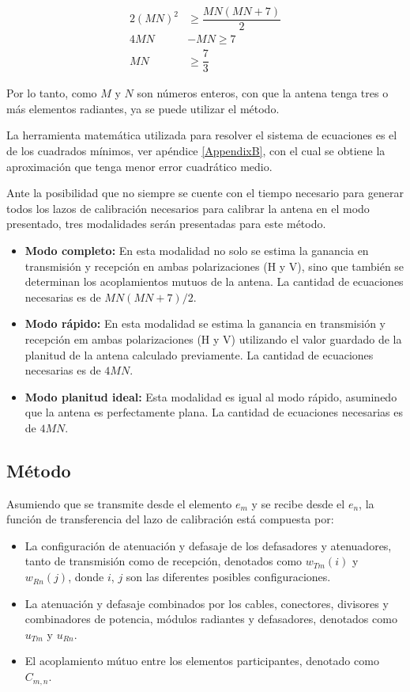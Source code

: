$$
\begin{aligned}
	2(MN)^2 &\ge  \dfrac{MN(MN + 7)}{2} \\
	4MN &- MN \ge7 \\
	MN &\ge \dfrac{7}{3}
\end{aligned}
$$

Por lo tanto, como $M$ y $N$ son números enteros, con que la antena tenga tres o más elementos radiantes, ya se puede utilizar el método.

La herramienta matemática utilizada para resolver el sistema de ecuaciones es el de los cuadrados mínimos,
ver apéndice \ref{AppendixB}, con el cual se obtiene la aproximación que tenga menor error cuadrático medio.

Ante la posibilidad que no siempre se cuente con el tiempo necesario para generar todos los lazos de calibración necesarios
para calibrar la antena en el modo presentado, tres modalidades serán presentadas para este método.

\begin{itemize}
	\item \textbf{Modo completo:} En esta modalidad no solo se estima la ganancia en transmisión y recepción en ambas
		polarizaciones (H y V), sino que también se determinan los acoplamientos mutuos de la antena. La cantidad de ecuaciones necesarias es
		de $MN(MN + 7)/2$.
	\item \textbf{Modo rápido:} En esta modalidad se estima la ganancia en transmisión y recepción em ambas polarizaciones
		(H y V) utilizando el valor guardado de la planitud de la antena calculado previamente. La cantidad de ecuaciones necesarias
		es de $4MN$.
	\item \textbf{Modo planitud ideal:} Esta modalidad es igual al modo rápido, asuminedo que la antena es perfectamente plana.
		La cantidad de ecuaciones necesarias es de $4MN$.
\end{itemize}


\subsection{Método}

Asumiendo que se transmite desde el elemento $e_m$ y se recibe desde el $e_n$, la función de transferencia del lazo de
calibración está compuesta por:

\begin{itemize}
	\item La configuración de atenuación y defasaje de los defasadores y atenuadores, tanto de transmisión como de recepción,
		denotados como $w_{Tm}(i)$ y $w_{Rn}(j)$, donde $i$, $j$ son las diferentes posibles configuraciones.
	\item La atenuación y defasaje combinados por los cables, conectores, divisores y combinadores de potencia, módulos radiantes
		y defasadores, denotados como $u_{Tm}$ y $u_{Rn}$.
	\item El acoplamiento mútuo entre los elementos participantes, denotado como $C_{m, n}$.
\end{itemize}

